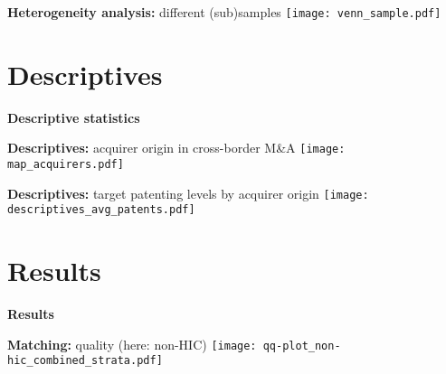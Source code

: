 \documentclass{beamer} %
\begin{document}
\begin{frame}{\textbf{Heterogeneity analysis:} different (sub)samples}
\texttt{[image: venn\_sample.pdf]}
\end{frame}

\section{Descriptives}
{
	\begin{frame}[plain]		
	\vspace{1cm}
	{\color{white}\LARGE \textbf{Descriptive statistics}}
\end{frame}
}

\begin{frame}{\textbf{Descriptives:} acquirer origin in cross-border M\&A}
\centering\texttt{[image: map\_acquirers.pdf]}
\end{frame}

\begin{frame}{\textbf{Descriptives:} target patenting levels by acquirer origin}
\centering\texttt{[image: descriptives\_avg\_patents.pdf]}
\end{frame}


\section{Results}
{
	\begin{frame}[plain]		
		\vspace{1cm}
		{\color{white}\LARGE \textbf{Results}}
	\end{frame}
}


\begin{frame}{\textbf{Matching:} quality (here: non-HIC)}
\centering\texttt{[image: qq-plot\_non-hic\_combined\_strata.pdf]}
\end{frame}
\end{document}
